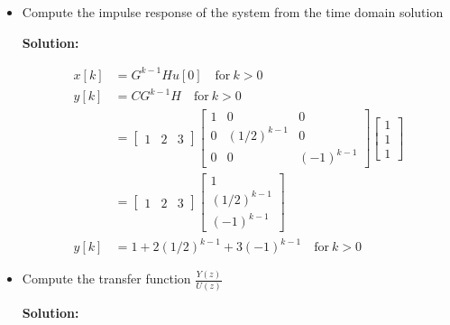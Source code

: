 \documentclass[twoside]{article}
\begin{document}
\begin{itemize}
\item Compute the impulse response of the system from the time domain
solution

\textbf{Solution:}

\begin{align*}
  x[k] &= G^{k-1} H u[0] \quad \mathrm{for} \  k > 0 \\
  y[k] &= C G^{k-1} H \quad \mathrm{for} \ k > 0 \\ 
         &= \left[ \begin{array}{ccc} 1 & 2 & 3 \end{array} \right] 
                 \left[ \begin{array}{ccc} 1 & 0 & 0\\ 0 & (1/2)^{k-1} & 0
    \\ 0 & 0 & (-1)^{k-1} \end{array} \right]
       \left[ \begin{array}{c} 1 \\ 1 \\ 1\end{array} \right] 
\\
&= \left[ \begin{array}{ccc} 1 & 2 & 3 \end{array} \right] 
\left[ \begin{array}{c} 1 \\ (1/2)^{k-1} \\ (-1)^{k-1} \end{array}
  \right] 
\\
y[k] &= 1 + 2 (1/2)^{k-1} + 3 (-1)^{k-1} \quad \mathrm{for} \ k > 0 
\end{align*}    

\item Compute the transfer function $\frac{Y(z)}{U(z)}$

\textbf{Solution:}


\end{itemize}
\end{document}
